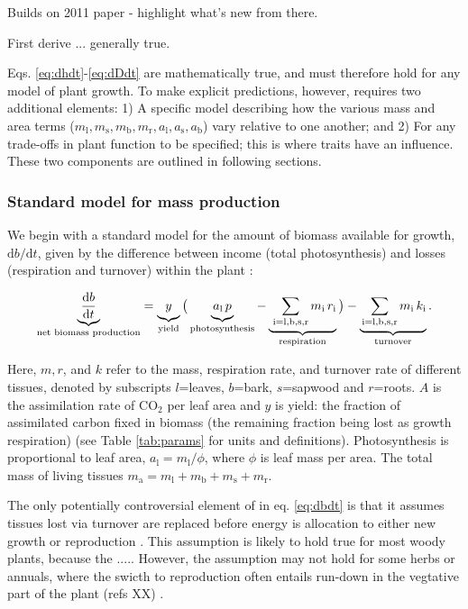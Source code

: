 \documentclass[12pt, a4paper]{article}
\begin{document}
Builds on 2011 paper - highlight what's new from there.

First derive ... generally true.

Eqs. \ref{eq:dhdt}-\ref{eq:dDdt} are mathematically true, and must
therefore hold for any model of plant growth. To make explicit
predictions, however, requires two additional elements: 1) A specific
model describing how the various mass and area terms
($m_\textrm{l}, m_\textrm{s}, m_\textrm{b}, m_\textrm{r}, a_\textrm{l}, a_\textrm{s}, a_\textrm{b}$)
vary relative to one another; and 2) For any trade-offs in plant
function to be specified; this is where traits have an influence.  These two components are outlined in following sections.

\subsubsection{Standard model for mass production}

We begin with a standard model for the amount of biomass available for
growth, $\textrm{d}b / \textrm{d}t$, given by the difference between income
(total photosynthesis) and losses (respiration and turnover) within the
plant \citep{makela-1997, Thornley-2000, falster-2011}:

\begin{equation}\label{eq:dbdt}
\underbrace{\strut \frac{\textrm{d}b}{\textrm{d}t}}_\textrm{net biomass production}
  = \underbrace{\strut y}_\textrm{yield}
    \big( \underbrace{\strut a_\textrm{l} \, p}_\textrm{photosynthesis} -
     \underbrace{\strut \,\sum_\textrm{i=l,b,s,r}{m_\textrm{i} \, r_\textrm{i}}}_\textrm{respiration}\big)
    - \underbrace{\strut \sum_\textrm{i=l,b,s,r}{m_\textrm{i} \, k_\textrm{i}}}_\textrm{turnover}.
\end{equation}

Here, $m,r$, and $k$ refer to the mass, respiration rate, and
turnover rate of different tissues, denoted by subscripts $l$=leaves,
$b$=bark, $s$=sapwood and $r$=roots. $A$ is the assimilation
rate of CO$_2$ per leaf area and $y$ is yield: the fraction of
assimilated carbon fixed in biomass (the remaining fraction being lost
as growth respiration) (see Table \ref{tab:params} for units and
definitions). Photosynthesis is proportional to leaf area,
$a_\textrm{l} = m_\textrm{l} / \phi$, where $\phi$ is leaf mass per area.
The total mass of living tissues $m_\textrm{a}=m_\textrm{l}+m_\textrm{b}+m_\textrm{s}+m_\textrm{r}.$

The only potentially controversial element of in eq. \ref{eq:dbdt} is that it assumes tissues lost via turnover are replaced before energy is allocation to either new growth or reproduction \citep{Thornley-2000}. This assumption is likely to hold true for most woody plants, because the ..... However, the assumption may not hold for some herbs or annuals, where the swicth to reproduction often entails run-down in the vegtative part of the plant (refs XX) \citep{ Thornley-2000}.
\end{document}
